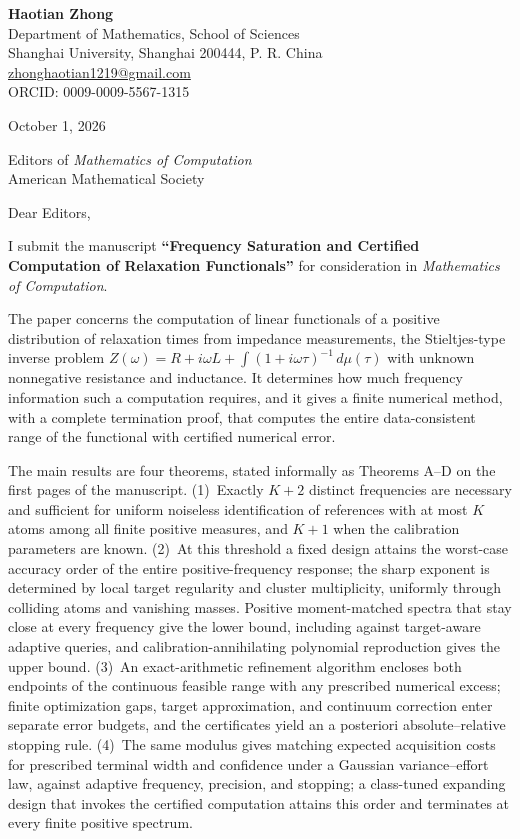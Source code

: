 \documentclass[11pt,letterpaper]{article}
\begin{document}
\textbf{Haotian Zhong}\\
Department of Mathematics, School of Sciences\\
Shanghai University, Shanghai 200444, P. R. China\\
\href{mailto:zhonghaotian1219@gmail.com}{zhonghaotian1219@gmail.com}\\
ORCID: 0009-0009-5567-1315

October 1, 2026

Editors of \textit{Mathematics of Computation}\\
American Mathematical Society

Dear Editors,

I submit the manuscript \textbf{``Frequency Saturation and Certified Computation of Relaxation Functionals''} for consideration in \textit{Mathematics of Computation}.

The paper concerns the computation of linear functionals of a positive distribution of relaxation times from impedance measurements, the Stieltjes-type inverse problem $Z(\omega)=R+i\omega L+\int(1+i\omega\tau)^{-1}\,d\mu(\tau)$ with unknown nonnegative resistance and inductance. It determines how much frequency information such a computation requires, and it gives a finite numerical method, with a complete termination proof, that computes the entire data-consistent range of the functional with certified numerical error.

The main results are four theorems, stated informally as Theorems A--D on the first pages of the manuscript. (1)~Exactly $K+2$ distinct frequencies are necessary and sufficient for uniform noiseless identification of references with at most $K$ atoms among all finite positive measures, and $K+1$ when the calibration parameters are known. (2)~At this threshold a fixed design attains the worst-case accuracy order of the entire positive-frequency response; the sharp exponent is determined by local target regularity and cluster multiplicity, uniformly through colliding atoms and vanishing masses. Positive moment-matched spectra that stay close at every frequency give the lower bound, including against target-aware adaptive queries, and calibration-annihilating polynomial reproduction gives the upper bound. (3)~An exact-arithmetic refinement algorithm encloses both endpoints of the continuous feasible range with any prescribed numerical excess; finite optimization gaps, target approximation, and continuum correction enter separate error budgets, and the certificates yield an a posteriori absolute--relative stopping rule. (4)~The same modulus gives matching expected acquisition costs for prescribed terminal width and confidence under a Gaussian variance--effort law, against adaptive frequency, precision, and stopping; a class-tuned expanding design that invokes the certified computation attains this order and terminates at every finite positive spectrum.
\end{document}
